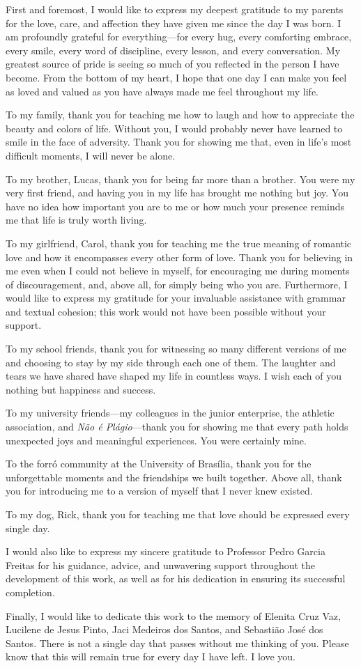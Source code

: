 First and foremost, I would like to express my deepest gratitude to my parents for the love, care, and affection they have given me since the day I was born. I am profoundly grateful for everything—for every hug, every comforting embrace, every smile, every word of discipline, every lesson, and every conversation. My greatest source of pride is seeing so much of you reflected in the person I have become. From the bottom of my heart, I hope that one day I can make you feel as loved and valued as you have always made me feel throughout my life.

To my family, thank you for teaching me how to laugh and how to appreciate the beauty and colors of life. Without you, I would probably never have learned to smile in the face of adversity. Thank you for showing me that, even in life's most difficult moments, I will never be alone.

To my brother, Lucas, thank you for being far more than a brother. You were my very first friend, and having you in my life has brought me nothing but joy. You have no idea how important you are to me or how much your presence reminds me that life is truly worth living.

To my girlfriend, Carol, thank you for teaching me the true meaning of romantic love and how it encompasses every other form of love. Thank you for believing in me even when I could not believe in myself, for encouraging me during moments of discouragement, and, above all, for simply being who you are. Furthermore, I would like to express my gratitude for your invaluable assistance with grammar and textual cohesion; this work would not have been possible without your support.

To my school friends, thank you for witnessing so many different versions of me and choosing to stay by my side through each one of them. The laughter and tears we have shared have shaped my life in countless ways. I wish each of you nothing but happiness and success.

To my university friends—my colleagues in the junior enterprise, the athletic association, and \textit{Não é Plágio}—thank you for showing me that every path holds unexpected joys and meaningful experiences. You were certainly mine.

To the forró community at the University of Brasília, thank you for the unforgettable moments and the friendships we built together. Above all, thank you for introducing me to a version of myself that I never knew existed.

To my dog, Rick, thank you for teaching me that love should be expressed every single day.

I would also like to express my sincere gratitude to Professor Pedro Garcia Freitas for his guidance, advice, and unwavering support throughout the development of this work, as well as for his dedication in ensuring its successful completion.

Finally, I would like to dedicate this work to the memory of Elenita Cruz Vaz, Lucilene de Jesus Pinto, Jaci Medeiros dos Santos, and Sebastião José dos Santos. There is not a single day that passes without me thinking of you. Please know that this will remain true for every day I have left. I love you.
